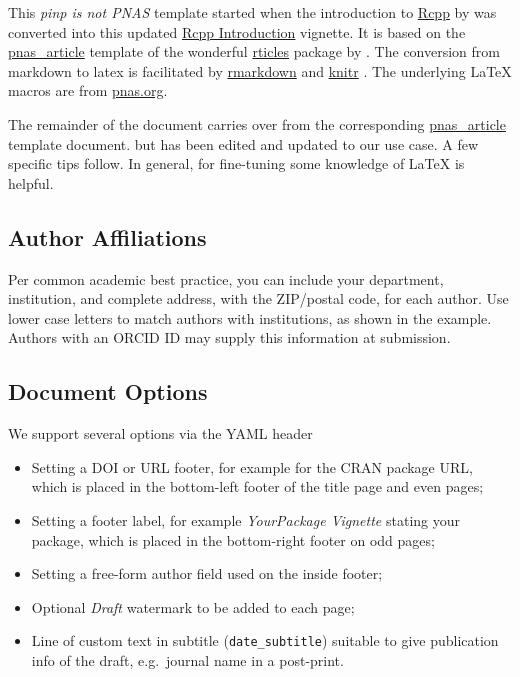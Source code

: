 \documentclass[letterpaper,9pt,twocolumn,twoside,]{pinp}
\providecommand{\tightlist}{%
  \setlength{\itemsep}{0pt}\setlength{\parskip}{0pt}}
\begin{document}
This \emph{pinp is not PNAS} template started when the introduction to
\href{http://dirk.eddelbuettel.com/code/rcpp.html}{Rcpp} by
\cite{PeerJ:Rcpp} was converted into this updated
\href{https://eddelbuettel.github.io/pinp/Rcpp-introduction.pdf}{Rcpp
Introduction} vignette. It is based on the
\href{https://github.com/rstudio/rticles/tree/master/inst/rmarkdown/templates/pnas_article}{pnas\_article}
template of the wonderful
\href{https://cran.r-project.org/package=rticles}{rticles} package by
\cite{CRAN:rticles}. The conversion from markdown to latex is
facilitated by
\href{https://cran.r-project.org/package=rmarkdown}{rmarkdown}
\citep{CRAN:rmarkdown} and
\href{https://cran.r-project.org/package=knitr}{knitr}
\citep{CRAN:knitr}. The underlying LaTeX macros are from
\href{http://www.pnas.org/site/authors/latex.xhtml}{pnas.org}.

The remainder of the document carries over from the corresponding
\href{https://github.com/rstudio/rticles/tree/master/inst/rmarkdown/templates/pnas_article}{pnas\_article}
template document. but has been edited and updated to our use case. A
few specific tips follow. In general, for fine-tuning some knowledge of
LaTeX is helpful.

\hypertarget{author-affiliations}{%
\subsection{Author Affiliations}\label{author-affiliations}}

Per common academic best practice, you can include your department,
institution, and complete address, with the ZIP/postal code, for each
author. Use lower case letters to match authors with institutions, as
shown in the example. Authors with an ORCID ID may supply this
information at submission.

\hypertarget{document-options}{%
\subsection{Document Options}\label{document-options}}

We support several options via the YAML header

\begin{itemize}
\tightlist
\item
  Setting a DOI or URL footer, for example for the CRAN package URL,
  which is placed in the bottom-left footer of the title page and even
  pages;
\item
  Setting a footer label, for example \emph{YourPackage Vignette}
  stating your package, which is placed in the bottom-right footer on
  odd pages;
\item
  Setting a free-form author field used on the inside footer;
\item
  Optional \emph{Draft} watermark to be added to each page;
\item
  Line of custom text in subtitle (\texttt{date\_subtitle}) suitable to
  give publication info of the draft, e.g.~journal name in a post-print.
\end{itemize}
\end{document}
